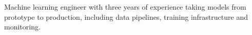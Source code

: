 Machine learning engineer with three years of experience taking models from
prototype to production, including data pipelines, training infrastructure
and monitoring.
